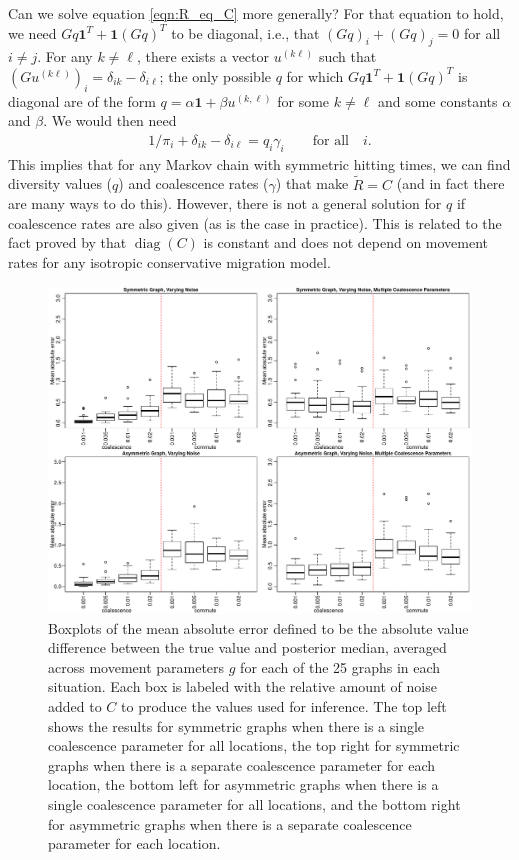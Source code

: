\documentclass{article}
\newcommand{\comdist}{\widetilde{R}}
\DeclareMathOperator{\diag}{\mathop{\mbox{diag}}}
\newcommand{\bone}{\mathbf{1}}
\begin{document}
Can we solve equation \eqref{eqn:R_eq_C} more generally?
For that equation to hold, we need $Gq \bone^T + \bone (Gq)^T$ to be diagonal,
i.e., that $(Gq)_i + (Gq)_j = 0$ for all $i \neq j$.
For any $k \neq \ell$, there exists a vector $u^{(k\ell)}$ such that $(Gu^{(k\ell)})_i = \delta_{ik} - \delta_{i\ell}$;
the only possible $q$ for which $Gq \bone^T + \bone (Gq)^T$ is diagonal
are of the form $q = \alpha \bone + \beta u^{(k,\ell)}$ for some $k \neq \ell$ and some constants $\alpha$ and $\beta$.
We would then need
\begin{align}
    1/\pi_i + \delta_{ik} - \delta_{i\ell} = q_i \gamma_i \qquad \text{for all} \quad i.
\end{align}
This implies that for any Markov chain with symmetric hitting times,
we can find diversity values ($q$) and coalescence rates ($\gamma$) that make $\comdist = C$
(and in fact there are many ways to do this).
However, there is not a general solution for $q$ if coalescence rates are also given (as is the case in practice).
This is related to the fact proved by \citet{strobeck1987average} 
that $\diag(C)$ is constant and does not depend on movement rates
for any isotropic conservative migration model.



\begin{figure}
\centering
\includegraphics[scale=.6]{figs/mult_noise}
\caption{Boxplots of the mean absolute error
defined to be the absolute value difference between the true value and posterior median,
averaged across movement parameters $g$ for each of the 25 graphs in each situation.
Each box is labeled with the relative amount of noise added to $C$ to produce the values used for inference.
The top left shows the results for symmetric graphs 
when there is a single coalescence parameter for all locations,
the top right for symmetric graphs 
when there is a separate coalescence parameter for each location,
the bottom left for asymmetric graphs 
when there is a single coalescence parameter for all locations,
and the bottom right for asymmetric graphs 
when there is a separate coalescence parameter for each location.}
\label{fig:mult_noise}
\end{figure}
\end{document}
